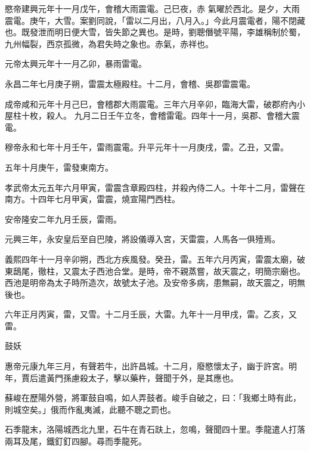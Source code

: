 \begin{pinyinscope}
 愍帝建興元年十一月戊午，會稽大雨震電。己巳夜，赤
 氣曜於西北。是夕，大雨震電。庚午，大雪。案劉同說，「雷以二月出，八月入。」今此月震電者，陽不閉藏也。既發泄而明日便大雪，皆失節之異也。是時，劉聰僭號平陽，李雄稱制於蜀，九州幅裂，西京孤微，為君失時之象也。赤氣，赤祥也。



 元帝太興元年十一月乙卯，暴雨雷電。



 永昌二年七月庚子朔，雷震太極殿柱。十二月，會稽、吳郡雷震電。



 成帝咸和元年十月己巳，會稽郡大雨震電。三年六月辛卯，臨海大雷，破郡府內小屋柱十枚，殺人。
 九月二日壬午立冬，會稽雷電。四年十一月，吳郡、會稽大震電。



 穆帝永和七年十月壬午，雷雨震電。升平元年十一月庚戌，雷。乙丑，又雷。



 五年十月庚午，雷發東南方。



 孝武帝太元五年六月甲寅，雷震含章殿四柱，并殺內侍二人。十年十二月，雷聲在南方。十四年七月甲寅，雷震，燒宣陽門西柱。



 安帝隆安二年九月壬辰，雷雨。



 元興三年，永安皇后至自巴陵，將設儀導入宮，天雷震，人馬各一俱殪焉。



 義熙四年十一月辛卯朔，西北方疾風發。癸丑，雷。五年六月丙寅，雷震太廟，破東鴟尾，徹柱，又震太子西池合堂。是時，帝不親蒸嘗，故天震之，明簡宗廟也。西池是明帝為太子時所造次，故號太子池。及安帝多病，患無嗣，故天震之，明無後也。



 六年正月丙寅，雷，又雪。十二月壬辰，大雷。九年十一月甲戌，雷。乙亥，又雷。



 鼓妖



 惠帝元康九年三月，有聲若牛，出許昌城。十二月，廢愍懷太子，幽于許宮。明年，賈后遣黃門孫慮殺太子，擊以藥杵，聲聞于外，是其應也。



 蘇峻在歷陽外營，將軍鼓自鳴，如人弄鼓者。峻手自破之，曰：「我鄉土時有此，則城空矣。」俄而作亂夷滅，此聽不聰之罰也。



 石季龍末，洛陽城西北九里，石牛在青石趺上，忽鳴，聲聞四十里。季龍遣人打落兩耳及尾，鐵釘釘四腳。尋而季龍死。




\end{pinyinscope}
